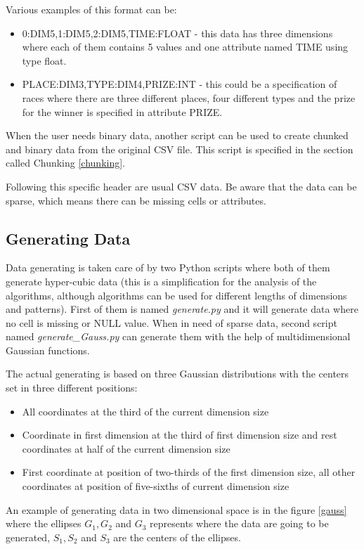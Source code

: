 Various examples of this format can be: 
\begin{itemize}
\item 0:DIM5,1:DIM5,2:DIM5,TIME:FLOAT - this data has three dimensions where each of them contains 5 values and one attribute named TIME using type float.
\item PLACE:DIM3,TYPE:DIM4,PRIZE:INT - this could be a specification of races where there are three different places, four different types and the prize for the winner is specified in attribute PRIZE.
\end{itemize}

When the user needs binary data, another script can be used to create chunked and binary data from the original CSV file. This script is specified in the section called Chunking \ref{chunking}.

Following this specific header are usual CSV data. Be aware that the data can be sparse, which means there can be missing cells or attributes.

\subsection{Generating Data}\label{generating}
Data generating is taken care of by two Python scripts where both of them generate hyper-cubic data (this is a simplification for the analysis of the algorithms, although algorithms can be used for different lengths of dimensions and patterns). First of them is named \textit{generate.py} and it will generate data where no cell is missing or NULL value.
When in need of sparse data, second script named \textit{generate\_Gauss.py} can generate them with the help of multidimensional Gaussian functions. 

The actual generating is based on three Gaussian distributions with the centers set in three different positions:
\begin{itemize}
\item All coordinates at the third of the current dimension size
\item Coordinate in first dimension at the third of first dimension size and rest coordinates at half of the current dimension size
\item First coordinate at position of two-thirds of the first dimension size, all other coordinates at position of five-sixths of current dimension size
\end{itemize}

An example of generating data in two dimensional space is in the figure \ref{gauss} where the ellipses $G_1, G_2$ and $G_3$ represents where the data are going to be generated, $S_1, S_2$ and $S_3$ are the centers of the ellipses.


